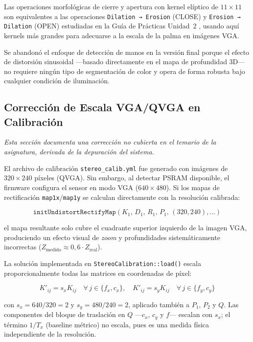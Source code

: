 \documentclass[12pt, a4paper]{article}
\begin{document}
Las operaciones morfológicas de cierre y apertura con kernel elíptico de $11\times11$
son equivalentes a las operaciones \texttt{Dilation → Erosion} (CLOSE) y
\texttt{Erosion → Dilation} (OPEN) estudiadas en la Guía de Prácticas Unidad~2
\cite{robles2026guia2}, usando aquí kernels más grandes para adecuarse a la escala
de la palma en imágenes VGA.

\noindent Se abandonó el enfoque de detección de manos en la versión final porque el
efecto de distorsión sinusoidal —basado directamente en el mapa de profundidad 3D—
no requiere ningún tipo de segmentación de color y opera de forma robusta bajo
cualquier condición de iluminación.

\subsection{Corrección de Escala VGA/QVGA en Calibración}
\label{sec:vgafix}

\emph{Esta sección documenta una corrección no cubierta en el temario de la asignatura,
derivada de la depuración del sistema.}

El archivo de calibración \texttt{stereo\_calib.yml} fue generado con imágenes de
$320\times240$ píxeles (QVGA). Sin embargo, al detectar PSRAM disponible, el firmware
configura el sensor en modo VGA ($640\times480$). Si los mapas de rectificación
\texttt{map1x}/\texttt{map1y} se calculan directamente con la resolución calibrada:

\begin{equation}
\texttt{initUndistortRectifyMap}(K_1,\,D_1,\,R_1,\,P_1,\,(320,240),\ldots)
\end{equation}

\noindent el mapa resultante solo cubre el cuadrante superior izquierdo de la imagen
VGA, produciendo un efecto visual de \emph{zoom} y profundidades sistemáticamente
incorrectas ($Z_{\text{medido}} \approx 0{,}6\cdot Z_{\text{real}}$).

La solución implementada en \texttt{StereoCalibration::load()} escala
proporcionalmente todas las matrices en coordenadas de píxel:

\begin{equation}
\label{eq:vgascale}
  K'_{ij} = s_x K_{ij} \quad \forall\,j \in \{f_x, c_x\},\quad
  K'_{ij} = s_y K_{ij} \quad \forall\,j \in \{f_y, c_y\}
\end{equation}

\noindent con $s_x = 640/320 = 2$ y $s_y = 480/240 = 2$, aplicado también a
$P_1$, $P_2$ y $Q$. Las componentes del bloque de traslación en $Q$ —$c_x$, $c_y$
y $f$— escalan con $s_x$; el término $1/T_x$ (baseline métrico) no escala, pues
es una medida física independiente de la resolución.
\end{document}
